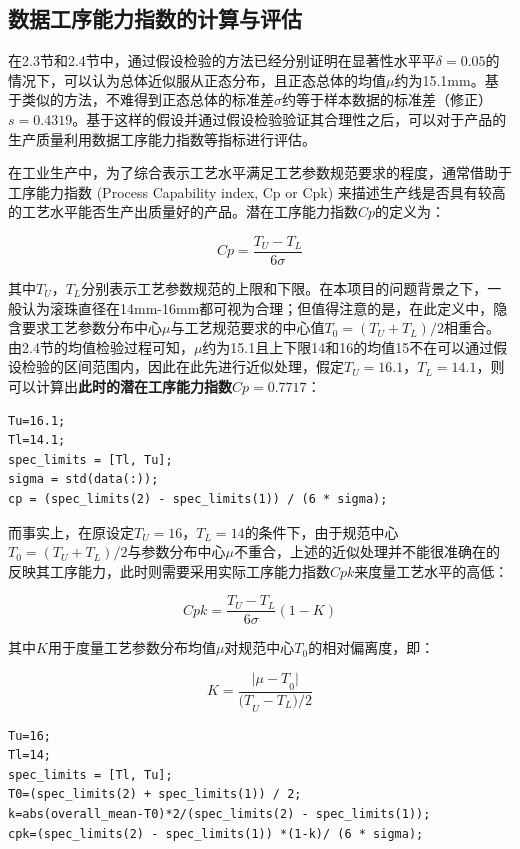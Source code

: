 \documentclass[12pt]{article}  %
\begin{document}
\subsection{数据工序能力指数的计算与评估}
在2.3节和2.4节中，通过假设检验的方法已经分别证明在显著性水平平$\delta=0.05$的情况下，可以认为总体近似服从正态分布，且正态总体的均值$\mu$约为15.1mm。基于类似的方法，不难得到正态总体的标准差$\sigma$约等于样本数据的标准差（修正）$s=0.4319$。基于这样的假设并通过假设检验验证其合理性之后，可以对于产品的生产质量利用数据工序能力指数等指标进行评估。

在工业生产中，为了综合表示工艺水平满足工艺参数规范要求的程度，通常借助于工序能力指数 (Process Capability index, Cp or Cpk) 来描述生产线是否具有较高的工艺水平能否生产出质量好的产品。潜在工序能力指数$Cp$的定义为：

\begin{equation}
	Cp=\frac{T_U-T_L}{6\sigma}
\end{equation}

其中$T_U$，$T_L$分别表示工艺参数规范的上限和下限。在本项目的问题背景之下，一般认为滚珠直径在14mm-16mm都可视为合理；但值得注意的是，在此定义中，隐含要求工艺参数分布中心$\mu$与工艺规范要求的中心值$T_0=(T_U+T_L)/2$相重合。由2.4节的均值检验过程可知，$\mu$约为15.1且上下限14和16的均值15不在可以通过假设检验的区间范围内，因此在此先进行近似处理，假定$T_U=16.1$，$T_L=14.1$，则可以计算出\textbf{此时的潜在工序能力指数$Cp=0.7717$}：

\begin{lstlisting}
Tu=16.1;
Tl=14.1;
spec_limits = [Tl, Tu]; 
sigma = std(data(:)); 
cp = (spec_limits(2) - spec_limits(1)) / (6 * sigma);
\end{lstlisting}

而事实上，在原设定$T_U=16$，$T_L=14$的条件下，由于规范中心$T_0=(T_U+T_L)/2$与参数分布中心$\mu$不重合，上述的近似处理并不能很准确在的反映其工序能力，此时则需要采用实际工序能力指数$Cpk$来度量工艺水平的高低：

\begin{equation}
	Cpk=\frac{T_U-T_L}{6\sigma}(1-K)
\end{equation}

其中$K$用于度量工艺参数分布均值$\mu$对规范中心$T_0$的相对偏离度，即：

\begin{equation}
	K=\frac{{|\mu-T}_0|}{{(T}_U-T_L)/2}
\end{equation}

\begin{lstlisting}
Tu=16;
Tl=14;
spec_limits = [Tl, Tu]; 
T0=(spec_limits(2) + spec_limits(1)) / 2;
k=abs(overall_mean-T0)*2/(spec_limits(2) - spec_limits(1));
cpk=(spec_limits(2) - spec_limits(1)) *(1-k)/ (6 * sigma);
\end{lstlisting}
\end{document}
